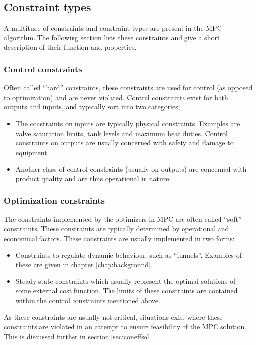 \subsection{Constraint types}
A multitude of constraints and constraint types are present in the MPC algorithm.
The following section lists these constraints and give a short description of their function and properties.
\subsubsection{Control constraints}
Often called ``hard'' constraints, these constraints are used for control (as opposed to optimization) and are never violated.
Control constraints exist for both outputs and inputs, and typically sort into two categories;
\begin{itemize}
  \item The constraints on inputs are typically physical constraints.
    Examples are valve saturation limits, tank levels and maximum heat      duties.
    Control constraints on outputs are usually concerned with safety and damage to equipment.
  \item Another class of control constraints (usually on outputs) are concerned with product quality and are thus operational in nature.
\end{itemize}

\subsubsection{Optimization constraints}
The constraints implemented by the optimizers in MPC are often called ``soft'' constraints.
These constraints are typically determined by operational and economical factors.
These constraints are usually implemented in two forms;
\begin{itemize}
\item Constraints to regulate dynamic behaviour, such as ``funnels''.
Examples of these are given in chapter \ref{chap:background}.
\item Steady-state constraints which usually represent the optimal solutions of some external cost function.
The limits of these constraints are contained within the control constraints mentioned above.
\end{itemize}
As these constraints are usually not critical, situations exist where these constraints are violated in an attempt to ensure feasibility of the MPC solution.
This is discussed further in section \ref{sec:coneffsol}.
 
